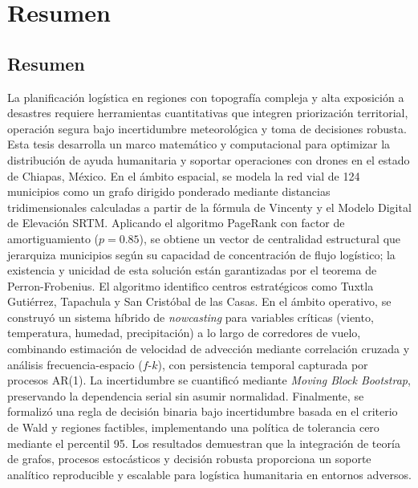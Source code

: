 \documentclass[
  spanish,
  us-letterpaper,
]{scrreprt}
\numberwithin{equation}{section}
\renewcommand*\contentsname{Tabla de contenidos}
\newcommand\contentsname{Tabla de contenidos}
\begin{document}
\renewcommand*\contentsname{Tabla de contenidos}
{
\hypersetup{linkcolor=}
\setcounter{tocdepth}{2}
\tableofcontents
}


\chapter{Resumen}\label{resumen}

\section*{Resumen}\label{resumen-1}


La planificación logística en regiones con topografía compleja y alta
exposición a desastres requiere herramientas cuantitativas que integren
priorización territorial, operación segura bajo incertidumbre
meteorológica y toma de decisiones robusta. Esta tesis desarrolla un
marco matemático y computacional para optimizar la distribución de ayuda
humanitaria y soportar operaciones con drones en el estado de Chiapas,
México. En el ámbito espacial, se modela la red vial de 124 municipios
como un grafo dirigido ponderado mediante distancias tridimensionales
calculadas a partir de la fórmula de Vincenty y el Modelo Digital de
Elevación SRTM. Aplicando el algoritmo PageRank con factor de
amortiguamiento (\(p=0.85\)), se obtiene un vector de centralidad
estructural que jerarquiza municipios según su capacidad de
concentración de flujo logístico; la existencia y unicidad de esta
solución están garantizadas por el teorema de Perron-Frobenius. El
algoritmo identifico centros estratégicos como Tuxtla Gutiérrez,
Tapachula y San Cristóbal de las Casas. En el ámbito operativo, se
construyó un sistema híbrido de \emph{nowcasting} para variables
críticas (viento, temperatura, humedad, precipitación) a lo largo de
corredores de vuelo, combinando estimación de velocidad de advección
mediante correlación cruzada y análisis frecuencia-espacio
(\(f\)-\(k\)), con persistencia temporal capturada por procesos AR(1).
La incertidumbre se cuantificó mediante \emph{Moving Block Bootstrap},
preservando la dependencia serial sin asumir normalidad. Finalmente, se
formalizó una regla de decisión binaria bajo incertidumbre basada en el
criterio de Wald y regiones factibles, implementando una política de
tolerancia cero mediante el percentil 95. Los resultados demuestran que
la integración de teoría de grafos, procesos estocásticos y decisión
robusta proporciona un soporte analítico reproducible y escalable para
logística humanitaria en entornos adversos.
\end{document}
